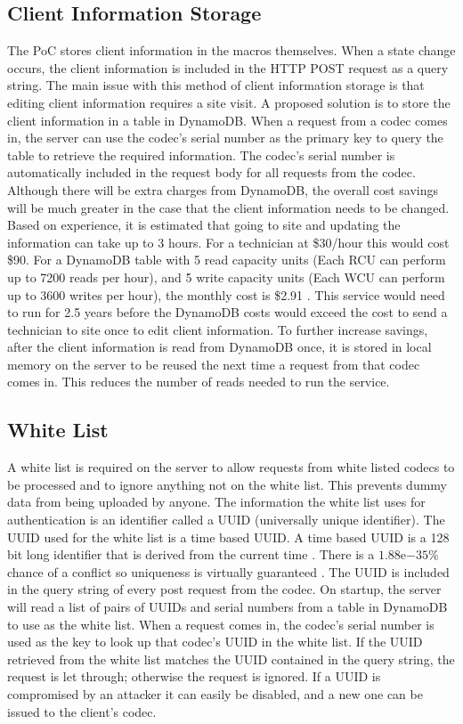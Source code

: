 \documentclass[letterpaper,12pt]{article}
\begin{document}
\subsection{Client Information Storage}
The PoC stores client information in the macros themselves. When a state change occurs, the client information is included in the HTTP POST request as a query string. The main issue with this method of client information storage is that editing client information requires a site visit. A proposed solution is to store the client information in a table in DynamoDB. When a request from a codec comes in, the server can use the codec's serial number as the primary key to query the table to retrieve the required information. The codec's serial number is automatically included in the request body for all requests from the codec. Although there will be extra charges from DynamoDB, the overall cost savings will be much greater in the case that the client information needs to be changed. Based on experience, it is estimated  that going to site and updating the information can take up to 3 hours. For a technician at \$30/hour this would cost \$90. For a DynamoDB table with 5 read capacity units (Each RCU can perform up to 7200 reads per hour), and 5 write capacity units (Each WCU can perform up to 3600 writes per hour), the monthly cost is \$2.91 \cite{dynamodb}. This service would need to run for 2.5 years before the DynamoDB costs would exceed the cost to send a technician to site once to edit client information. To further increase savings, after the client information is read from DynamoDB once, it is stored in local memory on the server to be reused the next time a request from that codec comes in. This reduces the number of reads needed to run the service.

\subsection{White List}
A white list is required on the server to allow requests from white listed codecs to be processed and to ignore anything not on the white list. This prevents dummy data from being uploaded by anyone. The information the white list uses for authentication is an identifier called a UUID (universally unique identifier). The UUID used for the white list is a time based UUID. A time based UUID is a 128 bit long identifier that is derived from the current time \cite{uuiddef}. There is a $1.88\mathrm{e}{-35}\%$ chance of a conflict so uniqueness is virtually guaranteed \cite{uuidunique}\cite{uuidunique2}. The UUID is included in the query string of every post request from the codec. On startup, the server will read a list of pairs of UUIDs and serial numbers from a table in DynamoDB to use as the white list. When a request comes in, the codec's serial number is used as the key to look up that codec's UUID in the white list. If the UUID retrieved from the white list matches the UUID contained in the query string, the request is let through; otherwise the request is ignored. If a UUID is compromised by an attacker it can easily be disabled, and a new one can be issued to the client's codec. 
\end{document}
